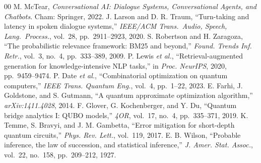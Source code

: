 \documentclass[journal]{IEEEtran}
\begin{document}
\begin{thebibliography}{00}
 M. McTear, \emph{Conversational AI: Dialogue Systems,
Conversational Agents, and Chatbots}. Cham: Springer, 2022.
 J. Larson and D. R. Traum, ``Turn-taking and latency
in spoken dialogue systems,'' \emph{IEEE/ACM Trans.\ Audio, Speech, Lang.\
Process.}, vol.~28, pp.~2911--2923, 2020.
 S. Robertson and H. Zaragoza, ``The probabilistic
relevance framework: BM25 and beyond,'' \emph{Found. Trends Inf. Retr.},
vol.~3, no.~4, pp.~333--389, 2009.
 P. Lewis \emph{et al.}, ``Retrieval-augmented generation
for knowledge-intensive NLP tasks,'' in \emph{Proc. NeurIPS}, 2020,
pp.~9459--9474.
 P. Date \emph{et al.}, ``Combinatorial optimization on
quantum computers,'' \emph{IEEE Trans. Quantum Eng.}, vol.~4,
pp.~1--22, 2023.
 E. Farhi, J. Goldstone, and S. Gutmann, ``A quantum
approximate optimization algorithm,'' \emph{arXiv:1411.4028}, 2014.
\bibitem{glover2019} F. Glover, G. Kochenberger, and Y. Du, ``Quantum
bridge analytics I: QUBO models,'' \emph{4OR}, vol.~17, no.~4,
pp.~335--371, 2019.
 K. Temme, S. Bravyi, and J. M. Gambetta, ``Error
mitigation for short-depth quantum circuits,'' \emph{Phys. Rev. Lett.},
vol.~119, 2017.
 E. B. Wilson, ``Probable inference, the law of
succession, and statistical inference,'' \emph{J. Amer. Stat. Assoc.},
vol.~22, no.~158, pp.~209--212, 1927.
\end{thebibliography}
\end{document}
